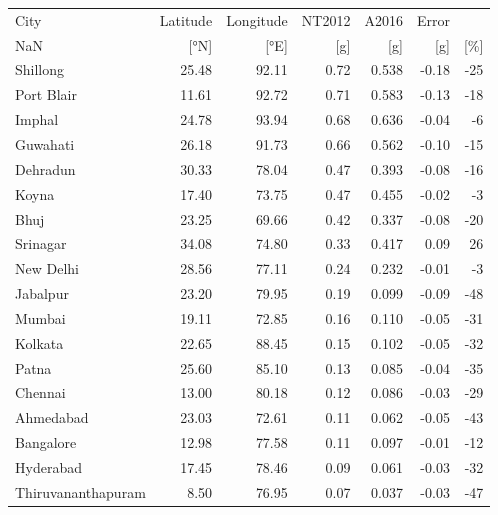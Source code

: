\begin{tabular}{lrrrrrr}
\toprule
               City & Latitude & Longitude & NT2012 &  A2016 & Error &     \\
                NaN &     [°N] &      [°E] &    [g] &    [g] &   [g] & [\%] \\
\midrule
           Shillong &    25.48 &     92.11 &   0.72 &  0.538 & -0.18 & -25 \\
         Port Blair &    11.61 &     92.72 &   0.71 &  0.583 & -0.13 & -18 \\
             Imphal &    24.78 &     93.94 &   0.68 &  0.636 & -0.04 &  -6 \\
           Guwahati &    26.18 &     91.73 &   0.66 &  0.562 & -0.10 & -15 \\
           Dehradun &    30.33 &     78.04 &   0.47 &  0.393 & -0.08 & -16 \\
              Koyna &    17.40 &     73.75 &   0.47 &  0.455 & -0.02 &  -3 \\
               Bhuj &    23.25 &     69.66 &   0.42 &  0.337 & -0.08 & -20 \\
           Srinagar &    34.08 &     74.80 &   0.33 &  0.417 &  0.09 &  26 \\
          New Delhi &    28.56 &     77.11 &   0.24 &  0.232 & -0.01 &  -3 \\
           Jabalpur &    23.20 &     79.95 &   0.19 &  0.099 & -0.09 & -48 \\
             Mumbai &    19.11 &     72.85 &   0.16 &  0.110 & -0.05 & -31 \\
            Kolkata &    22.65 &     88.45 &   0.15 &  0.102 & -0.05 & -32 \\
              Patna &    25.60 &     85.10 &   0.13 &  0.085 & -0.04 & -35 \\
            Chennai &    13.00 &     80.18 &   0.12 &  0.086 & -0.03 & -29 \\
          Ahmedabad &    23.03 &     72.61 &   0.11 &  0.062 & -0.05 & -43 \\
          Bangalore &    12.98 &     77.58 &   0.11 &  0.097 & -0.01 & -12 \\
          Hyderabad &    17.45 &     78.46 &   0.09 &  0.061 & -0.03 & -32 \\
 Thiruvananthapuram &     8.50 &     76.95 &   0.07 &  0.037 & -0.03 & -47 \\
\bottomrule
\end{tabular}
